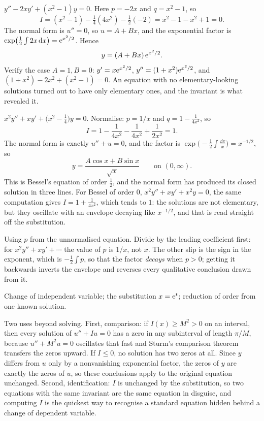 \begin{worked}
$y''-2xy'+(x^{2}-1)y=0$. Here $p=-2x$ and $q=x^{2}-1$, so
\[I=(x^{2}-1)-\tfrac14(4x^{2})-\tfrac12(-2)=x^{2}-1-x^{2}+1=0.\]
The normal form is $u''=0$, so $u=A+Bx$, and the exponential factor is $\exp\bigl(\tfrac12\int2x\,\mathrm{d} x\bigr)=\mathrm{e}^{x^{2}/2}$. Hence
\[y=(A+Bx)\,\mathrm{e}^{x^{2}/2}.\]
Verify the case $A=1,B=0$: $y'=x\mathrm{e}^{x^{2}/2}$, $y''=(1+x^{2})\mathrm{e}^{x^{2}/2}$, and $(1+x^{2})-2x^{2}+(x^{2}-1)=0$. An equation with no elementary-looking solutions turned out to have only elementary ones, and the invariant is what revealed it.
\end{worked}

\begin{worked}
$x^{2}y''+xy'+\bigl(x^{2}-\tfrac14\bigr)y=0$. Normalise: $p=1/x$ and $q=1-\tfrac{1}{4x^{2}}$, so
\[I=1-\frac{1}{4x^{2}}-\frac{1}{4x^{2}}+\frac{1}{2x^{2}}=1.\]
The normal form is exactly $u''+u=0$, and the factor is $\exp\bigl(-\tfrac12\int\tfrac{\dd x}{x}\bigr)=x^{-1/2}$, so
\[y=\frac{A\cos x+B\sin x}{\sqrt{x}}\qquad\text{on }(0,\infty).\]
This is Bessel's equation of order $\tfrac12$, and the normal form has produced its closed solution in three lines. For Bessel of order $0$, $x^{2}y''+xy'+x^{2}y=0$, the same computation gives $I=1+\tfrac{1}{4x^{2}}$, which tends to $1$: the solutions are not elementary, but they oscillate with an envelope decaying like $x^{-1/2}$, and that is read straight off the substitution.
\end{worked}

\begin{trap}
Using $p$ from the unnormalised equation. Divide by the leading coefficient first: for $x^{2}y''+xy'+\cdots$ the value of $p$ is $1/x$, not $x$. The other slip is the sign in the exponent, which is $-\tfrac12\int p$, so that the factor \emph{decays} when $p>0$; getting it backwards inverts the envelope and reverses every qualitative conclusion drawn from it.
\end{trap}

\begin{seealsob}Change of independent variable; the substitution $x=\mathrm{e}^{t}$; reduction of order from one known solution.\end{seealsob}

\begin{keynote}
Two uses beyond solving. First, comparison: if $I(x)\geq M^{2}>0$ on an interval, then every solution of $u''+Iu=0$ has a zero in any subinterval of length $\pi/M$, because $u''+M^{2}u=0$ oscillates that fast and Sturm's comparison theorem transfers the zeros upward. If $I\leq0$, no solution has two zeros at all. Since $y$ differs from $u$ only by a nonvanishing exponential factor, the zeros of $y$ are exactly the zeros of $u$, so these conclusions apply to the original equation unchanged. Second, identification: $I$ is unchanged by the substitution, so two equations with the same invariant are the same equation in disguise, and computing $I$ is the quickest way to recognise a standard equation hidden behind a change of dependent variable.
\end{keynote}

